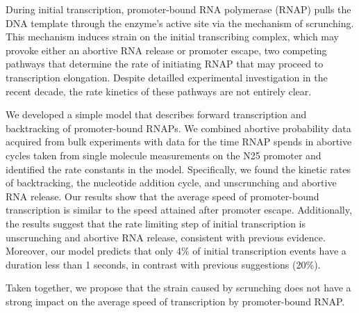 During initial transcription, promoter-bound RNA polymerase (RNAP) pulls the
DNA template through the enzyme's active site via the mechanism of scrunching.
This mechanism induces strain on the initial transcribing complex, which may
provoke either an abortive RNA release or promoter escape, two competing
pathways that determine the rate of initiating RNAP that may proceed to
transcription elongation. Despite detailled experimental investigation in the
recent decade, the rate kinetics of these pathways are not entirely clear.

We developed a simple model that describes forward transcription and
backtracking of promoter-bound RNAPs. We combined abortive probability data
acquired from bulk experiments with data for the time RNAP spends in abortive
cycles taken from single molecule measurements on the N25 promoter and
identified the rate constants in the model. Specifically, we found the kinetic
rates of backtracking, the nucleotide addition cycle, and unscrunching and
abortive RNA release. Our results show that the average speed of
promoter-bound transcription is similar to the speed attained after promoter
escape. Additionally, the results suggest that the rate limiting step of
initial transcription is unscrunching and abortive RNA release, consistent
with previous evidence. Moreover, our model predicts that only 4\% of initial
transcription events have a duration less than 1 seconds, in contrast with
previous suggestions (20\%).  

Taken together, we propose that the strain caused by scrunching does not have
a strong impact on the average speed of transcription by promoter-bound RNAP.
